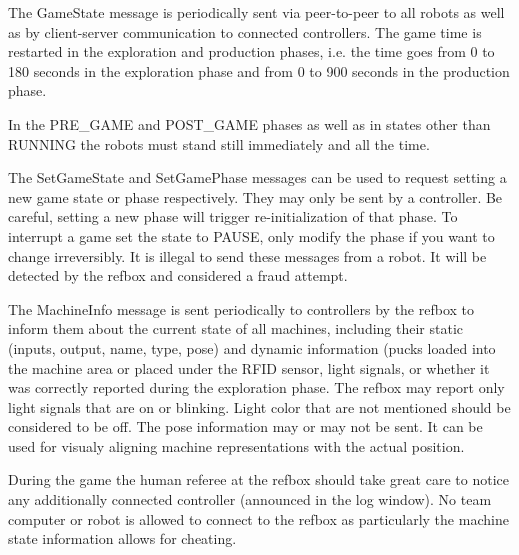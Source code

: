 \documentclass[a4paper]{article}
\begin{document}
%
{%
  The GameState message is periodically sent via peer-to-peer to all
  robots as well as by client-server communication to connected
  controllers. The game time is restarted in the exploration and
  production phases, i.e. the time goes from 0 to 180 seconds in the
  exploration phase and from 0 to 900 seconds in the production phase.

  \medskip

  In the PRE\_GAME and POST\_GAME phases as well as in states other
  than RUNNING the robots must stand still immediately and all the
  time.

  \medskip

  The SetGameState and SetGamePhase messages can be used to request
  setting a new game state or phase respectively. They may only be
  sent by a controller. Be careful, setting a new phase will trigger
  re-initialization of that phase. To interrupt a game set the state
  to PAUSE, only modify the phase if you want to change
  irreversibly. It is illegal to send these messages from a robot. It
  will be detected by the refbox and considered a fraud attempt.
}

%
{%
  The MachineInfo message is sent periodically to controllers by the
  refbox to inform them about the current state of all machines,
  including their static (inputs, output, name, type, pose) and
  dynamic information (pucks loaded into the machine area or placed
  under the RFID sensor, light signals, or whether it was correctly
  reported during the exploration phase. The refbox may report only
  light signals that are on or blinking. Light color that are not
  mentioned should be considered to be off. The pose information may
  or may not be sent. It can be used for visualy aligning machine
  representations with the actual position.

  \medskip

  During the game the human referee at the refbox should take great
  care to notice any additionally connected controller (announced in
  the log window). No team computer or robot is allowed to connect to
  the refbox as particularly the machine state information allows for
  cheating.
}
\end{document}
